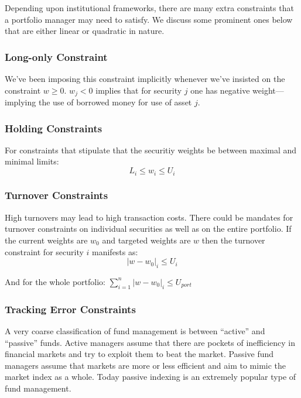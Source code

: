 \documentclass[11pt,]{article}
\begin{document}
Depending upon institutional frameworks, there are many extra
constraints that a portfolio manager may need to satisfy. We discuss
some prominent ones below that are either linear or quadratic in nature.

\subsubsection{Long-only Constraint}\label{long-only-constraint}

We've been imposing this constraint implicitly whenever we've insisted
on the constraint \(w\geq 0\). \(w_j<0\) implies that for security \(j\)
one has negative weight---implying the use of borrowed money for use of
asset \(j\).

\subsubsection{Holding Constraints}\label{holding-constraints}

For constraints that stipulate that the securitiy weights be between
maximal and minimal limits: \[L_i\leq w_i \leq U_i\]

\subsubsection{Turnover Constraints}\label{turnover-constraints}

High turnovers may lead to high transaction costs. There could be
mandates for turnover constraints on individual securities as well as on
the entire portfolio. If the current weights are \(w_0\) and targeted
weights are \(w\) then the turnover constraint for security \(i\)
manifests as: \[|w-w_0|_i\leq U_i\]

And for the whole portfolio: \(\sum_{i=1}^n |w-w_0|_i\leq U_{port}\)

\subsubsection{Tracking Error
Constraints}\label{tracking-error-constraints}

A very coarse classification of fund management is between ``active''
and ``passive'' funds. Active managers assume that there are pockets of
inefficiency in financial markets and try to exploit them to beat the
market. Passive fund managers assume that markets are more or less
efficient and aim to mimic the market index as a whole. Today passive
indexing is an extremely popular type of fund management.
\end{document}
